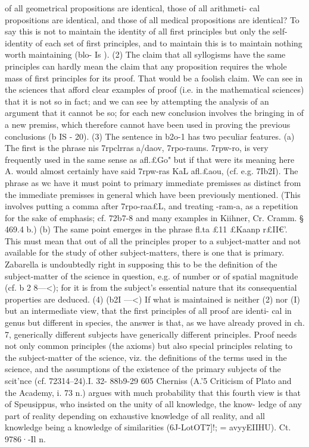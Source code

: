 {{{of all geometrical propositions are identical, those of all arithmeti-
cal propositions are identical, and those of all medical propositions
are identical? To say this is not to maintain the identity of all
first principles but only the self-identity of each set of first
principles, and to maintain this is to maintain nothing worth
maintaining (blo- Is ).
(2) The claim that all syllogisms have the same principles can
hardly mean the claim that any proposition requires the whole
mass of first principles for its proof. That would be a foolish
claim. We can see in the sciences that afford clear examples of
proof (i.e. in the mathematical sciences) that it is not so in fact;
and we can see by attempting the analysis of an argument that
it cannot be so; for each new conclusion involves the bringing
in of a new premiss, which therefore cannot have been used in
proving the previous conclusions (b IS - 20).
(3) The sentence in b2o-1 has two peculiar features. (a) The
first is the phrase nis 7rpclrras a/daov, 7rpo-rauns. 7rpw-ro, is very
frequently used in the same sense as afl.£Go" but if that were its
meaning here A. would almost certainly have said 7rpw-ras
KaL afl.£aou, (cf. e.g. 7Ib2I). The phrase as wc have it must point
to primary immediate premisses as distinct from the immediate
premisses in general which have been previously mentioned.
(This involves putting a comma after 7rpo-raa£L, and treating
-ram-a, as a repetition for the sake of emphasis; cf. 72b7-8 and
many examples in Kiihner, Cr. Cramm. § 469.4 b.) (b) The same
point emerges in the phrase fl.ta £11 £Kaanp r£II€'. This must mean
that out of all the principles proper to a subject-matter and not
available for the study of other subject-matters, there is one that
is primary. Zabarella is undoubtedly right in supposing this to
be the definition of the subject-matter of the science in question,
e.g. of number or of spatial magnitude (cf. b 2 8---<}); for it is from
the subject's essential nature that its consequential properties
are deduced.
(4) (b2I ---<}) If what is maintained is neither (2) nor (I) but an
intermediate view, that the first principles of all proof are identi-
cal in genus but different in species, the answer is that, as we
have already proved in ch. 7, generically different subjects have
generically different principles. Proof needs not only common
principles (the axioms) but also special principles relating to the
subject-matter of the science, viz. the definitions of the terms
used in the science, and the assumptions of the existence of the
primary subjects of the scit'nce (cf. 72314--24).I. 32- 88b9-29
605
Cherniss (A.'5 Criticism of Plato and the Academy, i. 73 n.)
argues with much probability that this fourth view is that of
Speusippus, who insisted on the unity of all knowledge, the know-
ledge of any part of reality depending on exhaustive knowledge
of all reality, and all knowledge being a knowledge of similarities
(6J-LotOT7]!; = avyyEIIHU). Ct. 9786·-Il n.

}
